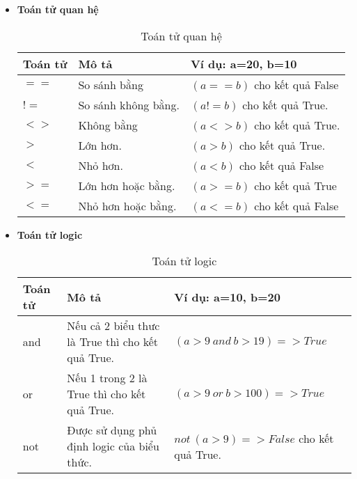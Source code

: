 \documentclass[../main-report.tex]{subfiles}
\begin{document}
\begin{itemize}
\item \textbf{Toán tử quan hệ}
\begin{table}[ht!]
\centering
\begin{tabular}{|>{\centering\arraybackslash}p{2cm}|>{\centering\arraybackslash}p{5cm}|>{\centering\arraybackslash}p{5cm}|}
\hline
\textbf{Toán tử} & \textbf{Mô tả}             & \textbf{Ví dụ: a=20, b=10} \\ \hline
$==$             & So sánh bằng               & $(a==b)$ cho kết quả False \\ \hline
$!=$             & So sánh không bằng.        & $(a!=b)$ cho kết quả True.  \\ \hline
$<>$             & Không bằng                 & $(a<>b)$ cho kết quả True.   \\ \hline
$>$              & Lớn hơn.                   & $(a>b)$ cho kết quả True.    \\ \hline
$<$              & Nhỏ hơn.                   & $(a<b)$ cho kết quả False   \\ \hline
$>=$             & Lớn hơn hoặc bằng.         & $(a>=b)$ cho kết quả True   \\ \hline
$<=$             & Nhỏ hơn hoặc bằng.         & $(a<=b)$ cho kết quả False    \\ \hline
\end{tabular}
\caption{Toán tử quan hệ}
\label{tab:toán tử quan hệ}
\end{table}

\item \textbf{Toán tử logic}
\begin{table}[ht!]
\centering
\begin{tabular}{|>{\centering\arraybackslash}p{2cm}|>{\centering\arraybackslash}p{5cm}|>{\centering\arraybackslash}p{5cm}|}
\hline
\textbf{Toán tử} & \textbf{Mô tả}             & \textbf{Ví dụ: a=10, b=20} \\ \hline
and             & Nếu cả 2 biểu thưc là True thì cho kết quả True.               & $(a>9\:and\:b>19) => True$  \\ \hline
or             & Nếu 1 trong 2 là True thì cho kết quả True.        & $(a>9\:or\:b>100) => True$  \\ \hline
not             & Được sử dụng phủ định logic của biểu thức.                 & $not\: (a>9) => False$ cho kết quả True.   \\ \hline
\end{tabular}
\caption{Toán tử logic}
\label{tab:toán tử logic}
\end{table}


\end{itemize}
\end{document}
